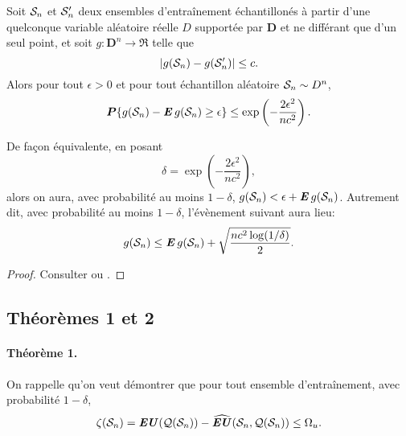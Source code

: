 \begin{lemme}
  \label{lem:mcdiarmid}
  Soit $\S_n$ et $\S_n'$ deux ensembles d'entraînement échantillonés à partir d'une
  quelconque variable aléatoire réelle $D$ supportée par $\bm D$ et ne
  différant que d'un seul point, et soit $g:{\bm D}^n\to\Re$ telle que
  \begin{equation}
    |g(\S_n) - g(\S_n')| \leq c.
  \end{equation}
  Alors pour tout $\epsilon>0$ et pour tout échantillon aléatoire $\S_n \sim D^n$,
  \begin{equation}
    \pp\{g(\S_n) - \E g(\S_n) \geq \epsilon\} \leq \exp\left(-\frac{2\epsilon^2}{nc^2}\right).
  \end{equation}
\end{lemme}

\begin{rem}
  De façon équivalente, en posant
  \begin{equation}
    \delta = \exp\left(-\frac{2\epsilon^2}{nc^2}\right),
  \end{equation}
  alors on aura, avec probabilité au moins $1-\delta$, $g(\S_n) < \epsilon + \E g(\S_n)$. Autrement
  dit, avec probabilité au moins $1-\delta$, l'évènement suivant aura lieu:
  \begin{equation}
    g(\S_n) \leq \E g(\S_n) + \sqrt{\frac{nc^2\log(1/\delta)}{2}}.
  \end{equation}
\end{rem}

\begin{proof}
  Consulter \cite{mohri2012foundations} ou \cite{boucheron2013concentration}.
\end{proof}

\subsection{Théorèmes 1 et 2}

\paragraph{Théorème 1.} On rappelle qu'on veut démontrer que pour tout ensemble
d'entraînement, avec probabilité $1-\delta$, 
\begin{equation}
  \zeta(\S_n) = \EU(\alg(\S_n)) - \hEU(\S_n,\alg(\S_n)) \leq \Omega_u.
\end{equation}

